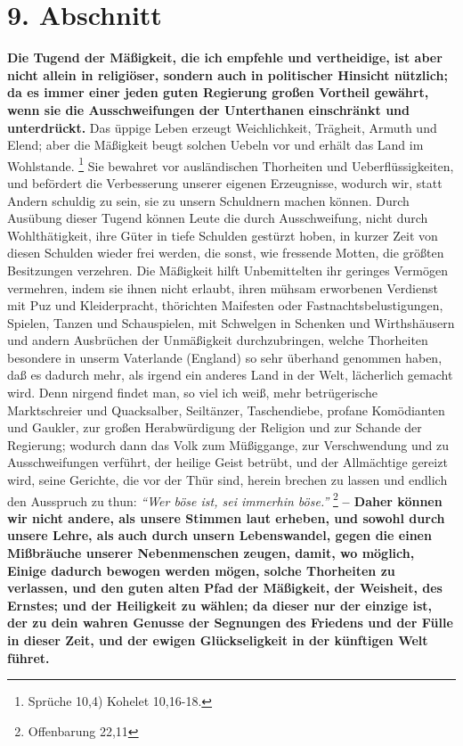 \section{9. Abschnitt} \label{kap18_ab9}

\textbf{Die Tugend der Mäßigkeit, die ich empfehle und vertheidige, ist aber
nicht
allein in religiöser, sondern auch in politischer Hinsicht
nützlich; da es immer
einer jeden guten Regierung großen Vortheil gewährt, wenn sie die
Ausschweifungen der Unterthanen einschränkt und unterdrückt.} Das üppige Leben
erzeugt Weichlichkeit, Trägheit, Armuth und Elend;
aber die Mäßigkeit beugt
solchen Uebeln vor und erhält das Land im Wohlstande.
\footnote{Sprüche 10,4)
Kohelet 10,16-18.}
Sie bewahret vor ausländischen Thorheiten und
Ueberflüssigkeiten, und befördert die Verbesserung unserer eigenen Erzeugnisse,
wodurch wir, statt Andern schuldig zu sein, sie zu unsern Schuldnern machen
können. Durch Ausübung dieser Tugend können Leute die durch Ausschweifung, nicht
durch Wohlthätigkeit, ihre Güter in tiefe Schulden gestürzt hoben, in kurzer
Zeit von diesen Schulden wieder frei werden, die sonst, wie fressende Motten,
die größten Besitzungen verzehren. Die Mäßigkeit hilft Unbemittelten ihr
geringes Vermögen vermehren, indem sie ihnen nicht erlaubt, ihren mühsam
erworbenen Verdienst mit Puz und Kleiderpracht, thörichten Maifesten oder
Fastnachtsbelustigungen, Spielen, Tanzen und Schauspielen, mit
Schwelgen in
Schenken und Wirthshäusern und andern Ausbrüchen der
Unmäßigkeit durchzubringen,
welche Thorheiten besondere in unserm Vaterlande (England)
so sehr überhand
genommen haben, daß es dadurch mehr, als irgend ein anderes Land in der Welt,
lächerlich gemacht wird. Denn nirgend findet man, so viel ich weiß, mehr
betrügerische Marktschreier und Quacksalber, Seiltänzer,
Taschendiebe, profane
Komödianten und Gaukler, zur großen Herabwürdigung der Religion
und zur Schande
der Regierung; wodurch dann das Volk zum Müßiggange, zur
Verschwendung und zu
Ausschweifungen verführt, der heilige Geist betrübt, und der Allmächtige gereizt
wird, seine Gerichte, die vor der Thür sind, herein brechen zu lassen und
endlich den Ausspruch zu thun:
\textit{"`Wer böse ist, sei immerhin böse."'}
\footnote{Offenbarung 22,11}
\textbf{-- Daher
können wir nicht andere, als unsere
Stimmen laut erheben, und sowohl durch unsere Lehre, als auch durch unsern
Lebenswandel, gegen die einen Mißbräuche unserer Nebenmenschen zeugen, damit, wo
möglich, Einige dadurch bewogen werden mögen, solche Thorheiten zu verlassen,
und den guten alten Pfad der Mäßigkeit, der Weisheit, des Ernstes; und der
Heiligkeit zu wählen; da dieser nur der einzige ist, der zu dein wahren Genusse
der Segnungen des Friedens und der Fülle in dieser Zeit, und der ewigen
Glückseligkeit in der künftigen Welt führet.}

